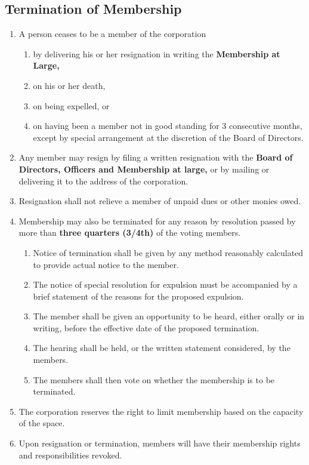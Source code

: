 \documentclass{article}
\begin{document}
\subsection{Termination of Membership}
\begin{enumerate}
    \item A person ceases to be a member of the corporation
    \begin{enumerate}
    \item by delivering his or her resignation in writing the \textbf{Membership at Large,}
    \item on his or her death,
    \item on being expelled, or
    \item on having been a member not in good standing for 3 consecutive months, except by special arrangement at the discretion of the Board of Directors.
    \end{enumerate}
    \item Any member may resign by filing a written resignation with the \textbf{Board of Directors, Officers and Membership at large,} or by mailing or delivering it to the address of the corporation.
    \item Resignation shall not relieve a member of unpaid dues or other monies owed.
    \item Membership may also be terminated for any reason by resolution passed by more than \textbf{three quarters (3/4th)} of the voting members.
    \begin{enumerate}
        \item Notice of termination shall be given by any method reasonably calculated to provide actual notice to the member.
        \item The notice of special resolution for expulsion must be accompanied by a brief statement of the reasons for the proposed expulsion.
        \item The member shall be given an opportunity to be heard, either orally or in writing, before the effective date of the proposed termination.
        \item The hearing shall be held, or the written statement considered, by the members.
        \item The members shall then vote on whether the membership is to be terminated.
    \end{enumerate}
    \item The corporation reserves the right to limit membership based on the capacity of the space.
    \item Upon resignation or termination, members will have their membership rights and responsibilities revoked.
\end{enumerate}
\end{document}
